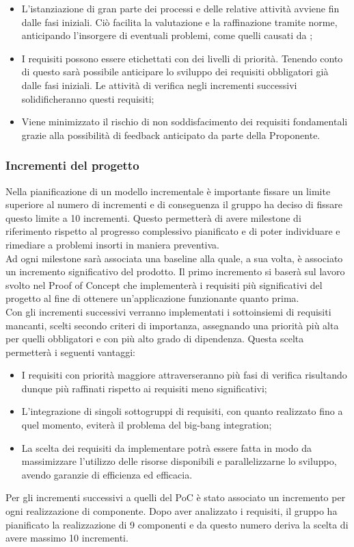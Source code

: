         \begin{itemize}
            \item L'istanziazione di gran parte dei processi e delle relative attività avviene fin dalle fasi iniziali.
            Ciò facilita la valutazione e la raffinazione tramite norme, anticipando l'insorgere di eventuali problemi,
            come quelli causati da ;
            \item I requisiti possono essere etichettati con dei livelli di priorità. Tenendo conto di questo sarà
            possibile anticipare lo sviluppo dei requisiti obbligatori già dalle fasi iniziali. Le attività di verifica
            negli incrementi successivi solidificheranno questi requisiti;
            \item Viene minimizzato il rischio di non soddisfacimento dei requisiti fondamentali grazie alla possibilità
            di feedback anticipato da parte della Proponente.
        \end{itemize}
        
	\subsubsection{Incrementi del progetto}
	Nella pianificazione di un modello incrementale è importante fissare un limite superiore al numero di incrementi e di conseguenza
	il gruppo ha deciso di fissare questo limite a 10 incrementi. Questo permetterà di avere
	milestone di riferimento rispetto al progresso complessivo pianificato e di poter individuare e rimediare a problemi 			insorti in 	maniera preventiva.\\
	Ad ogni milestone sarà associata una baseline alla quale, a sua volta, è associato un incremento significativo del prodotto.
	Il primo incremento si baserà sul lavoro svolto nel Proof of Concept che implementerà i requisiti più significativi del progetto
	al fine di ottenere un'applicazione funzionante quanto prima.\\
	Con gli incrementi successivi verranno implementati i sottoinsiemi di requisiti
	mancanti, scelti secondo criteri di importanza, assegnando una priorità più alta per quelli obbligatori e con più alto grado di
	dipendenza. Questa scelta permetterà i seguenti vantaggi:
	\begin{itemize}
		\item I requisiti con priorità maggiore attraverseranno più fasi di verifica risultando dunque più raffinati rispetto ai requisiti 				meno significativi;
		\item L'integrazione di singoli sottogruppi di requisiti, con quanto realizzato fino a quel momento, eviterà il problema del big-bang 		integration;
		\item La scelta dei requisiti da implementare potrà essere fatta in modo da massimizzare l’utilizzo delle risorse disponibili e 				parallelizzarne lo sviluppo, avendo garanzie di efficienza ed efficacia.
	\end{itemize}
	Per gli incrementi successivi a quelli del PoC è stato associato un incremento per ogni realizzazione di componente. Dopo aver analizzato 	i requisiti, il gruppo ha pianificato la realizzazione di 9 componenti e da questo numero deriva la scelta di avere massimo 10 					incrementi.